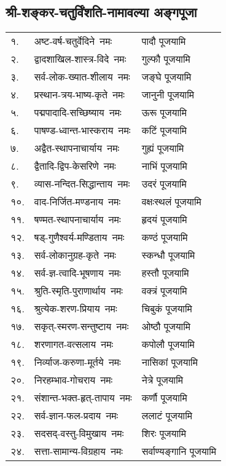 \begin{center}
\section{श्री-शङ्कर-चतुर्विंशति-नामावल्या अङ्गपूजा}
\begin{tabular}{lll}
१. & अष्ट-वर्ष-चतुर्वेदिने~नमः &  पादौ पूजयामि\\
२. & द्वादशाखिल-शास्त्र-विदे~नमः &  गुल्फौ पूजयामि\\
३. & सर्व-लोक-ख्यात-शीलाय~नमः &  जङ्घे पूजयामि\\
४. & प्रस्थान-त्रय-भाष्य-कृते~नमः &  जानुनी पूजयामि\\
५. & पद्मपादादि-सच्छिष्याय~नमः &  ऊरू पूजयामि\\
६. & पाषण्ड-ध्वान्त-भास्कराय~नमः &  कटिं पूजयामि\\
७. & अद्वैत-स्थापनाचार्याय~नमः &  गुह्यं पूजयामि\\
८. & द्वैतादि-द्विप-केसरिणे~नमः &  नाभिं पूजयामि\\
९. & व्यास-नन्दित-सिद्धान्ताय~नमः &  उदरं पूजयामि\\
१०. & वाद-निर्जित-मण्डनाय~नमः &  वक्षःस्थलं पूजयामि\\
११. & षण्मत-स्थापनाचार्याय~नमः &  हृदयं पूजयामि\\
१२. & षड्-गुणैश्वर्य-मण्डिताय~नमः &  कण्ठं पूजयामि\\
१३. & सर्व-लोकानुग्रह-कृते~नमः &  स्कन्धौ पूजयामि\\
१४. & सर्व-ज्ञ-त्वादि-भूषणाय~नमः &  हस्तौ पूजयामि\\
१५. & श्रुति-स्मृति-पुराणार्थाय~नमः &  वक्त्रं पूजयामि\\
१६. & श्रुत्येक-शरण-प्रियाय~नमः &  चिबुकं पूजयामि\\
१७. & सकृत्-स्मरण-सन्तुष्टाय~नमः &  ओष्ठौ पूजयामि\\
१८. & शरणागत-वत्सलाय~नमः &  कपोलौ पूजयामि\\
१९. & निर्व्याज-करुणा-मूर्तये~नमः &  नासिकां पूजयामि\\
२०. & निरहम्भाव-गोचराय~नमः &  नेत्रे पूजयामि\\
२१. & संशान्त-भक्त-हृत्-तापाय~नमः &  कर्णौ पूजयामि\\
२२. & सर्व-ज्ञान-फल-प्रदाय~नमः &  ललाटं पूजयामि\\
२३. & सदसद्-वस्तु-विमुखाय~नमः &  शिरः पूजयामि\\
२४. & सत्ता-सामान्य-विग्रहाय~नमः& सर्वाण्यङ्गानि पूजयामि\\
\end{tabular}


\begingroup
\centering
\setlength{\columnseprule}{1pt}
\let\chapt\sect

\endgroup





\end{center}
